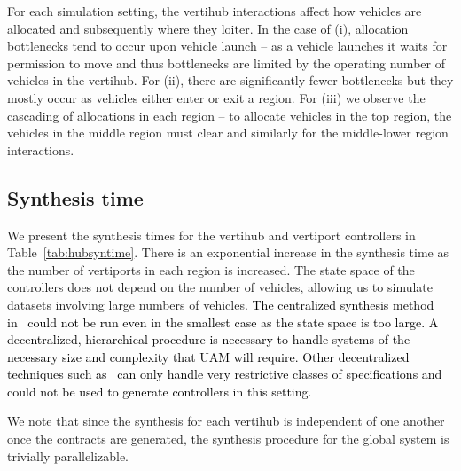 For each simulation setting, the vertihub interactions affect how vehicles are allocated and subsequently where they loiter.
In the case of (i), allocation bottlenecks tend to occur upon vehicle launch -- as a vehicle launches it waits for permission to move and thus bottlenecks are limited by the operating number of vehicles in the vertihub.
For (ii), there are significantly fewer bottlenecks but they mostly occur as vehicles either enter or exit a region.
For (iii) we observe the cascading of allocations in each region -- to allocate vehicles in the top region, the vehicles in the middle region must clear and similarly for the middle-lower region interactions.

\subsection{Synthesis time}

We present the synthesis times for the vertihub and vertiport controllers in Table~\ref{tab:hubsyntime}. 
There is an exponential increase in the synthesis time as the number of vertiports in each region is increased.
The state space of the controllers does not depend on the number of vehicles, allowing us to simulate datasets involving large numbers of vehicles. \textcolor{black}{
The centralized synthesis method in~\cite{bh18} could not be run even in the smallest case as the state space is too large. A decentralized, hierarchical procedure is necessary to handle systems of the necessary size and complexity that UAM will require. Other decentralized techniques such as~\cite{bhnfm} can only handle very restrictive classes of specifications and could not be used to generate controllers in this setting.}

We note that since the synthesis for each vertihub is independent of one another once the contracts are generated, the synthesis procedure for the global system is trivially parallelizable. 

\begin{table}[t!]
	\centering
	\caption{Synthesis times for vertihub/vertiport controllers}
	\label{tab:hubsyntime}
	\centering
\end{table}
